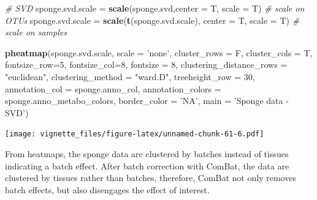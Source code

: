\documentclass[]{book}
\newenvironment{Shaded}{\begin{snugshade}}{\end{snugshade}}
\newcommand{\KeywordTok}[1]{\textcolor[rgb]{0.13,0.29,0.53}{\textbf{#1}}}
\newcommand{\DataTypeTok}[1]{\textcolor[rgb]{0.13,0.29,0.53}{#1}}
\newcommand{\DecValTok}[1]{\textcolor[rgb]{0.00,0.00,0.81}{#1}}
\newcommand{\StringTok}[1]{\textcolor[rgb]{0.31,0.60,0.02}{#1}}
\newcommand{\CommentTok}[1]{\textcolor[rgb]{0.56,0.35,0.01}{\textit{#1}}}
\newcommand{\NormalTok}[1]{#1}
\begin{document}
\begin{Shaded}
\begin{Highlighting}[]
\CommentTok{# SVD}
\NormalTok{sponge.svd.scale =}\StringTok{ }\KeywordTok{scale}\NormalTok{(sponge.svd,}\DataTypeTok{center =}\NormalTok{ T, }\DataTypeTok{scale =}\NormalTok{ T) }\CommentTok{# scale on OTUs}
\NormalTok{sponge.svd.scale =}\StringTok{ }\KeywordTok{scale}\NormalTok{(}\KeywordTok{t}\NormalTok{(sponge.svd.scale), }\DataTypeTok{center =}\NormalTok{ T, }\DataTypeTok{scale =}\NormalTok{ T) }\CommentTok{# scale on samples}

\KeywordTok{pheatmap}\NormalTok{(sponge.svd.scale, }
         \DataTypeTok{scale =} \StringTok{'none'}\NormalTok{, }
         \DataTypeTok{cluster_rows =}\NormalTok{ F, }
         \DataTypeTok{cluster_cols =}\NormalTok{ T, }
         \DataTypeTok{fontsize_row=}\DecValTok{5}\NormalTok{, }\DataTypeTok{fontsize_col=}\DecValTok{8}\NormalTok{,}
         \DataTypeTok{fontsize =} \DecValTok{8}\NormalTok{,}
         \DataTypeTok{clustering_distance_rows =} \StringTok{"euclidean"}\NormalTok{,}
         \DataTypeTok{clustering_method =} \StringTok{"ward.D"}\NormalTok{,}
         \DataTypeTok{treeheight_row =} \DecValTok{30}\NormalTok{,}
         \DataTypeTok{annotation_col =}\NormalTok{ sponge.anno_col,}
         \DataTypeTok{annotation_colors =}\NormalTok{ sponge.anno_metabo_colors,}
         \DataTypeTok{border_color =} \StringTok{'NA'}\NormalTok{,}
         \DataTypeTok{main =} \StringTok{'Sponge data - SVD'}\NormalTok{)}
\end{Highlighting}
\end{Shaded}

\texttt{[image: vignette\_files/figure-latex/unnamed-chunk-61-6.pdf]}

From heatmaps, the sponge data are clustered by batches instead of
tissues indicating a batch effect. After batch correction with ComBat,
the data are clustered by tissues rather than batches, therefore, ComBat
not only removes batch effects, but also disengages the effect of
interest.
\end{document}
